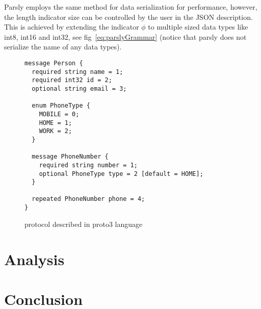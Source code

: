 \documentclass{article}
\begin{document}
Parsly employs the same method for data serialization for performance, however, the length indicator size can be controlled by the user in the JSON description. This is achieved by extending the indicator $\phi$ to multiple sized data types like int8, int16 and int32, see fig~\ref{eq:parslyGrammar} (notice that parsly does not serialize the name of any data types).

\begin{figure}
\begin{center}
\lstset{language=c++}
\label{lst:proto3}
\begin{lstlisting}
message Person {
  required string name = 1;
  required int32 id = 2;
  optional string email = 3;

  enum PhoneType {
    MOBILE = 0;
    HOME = 1;
    WORK = 2;
  }

  message PhoneNumber {
    required string number = 1;
    optional PhoneType type = 2 [default = HOME];
  }

  repeated PhoneNumber phone = 4;
}
\end{lstlisting}
\caption{protocol described in proto3 language}
\end{center}
\end{figure}


\section{Analysis} %


\section{Conclusion} %
\end{document}
